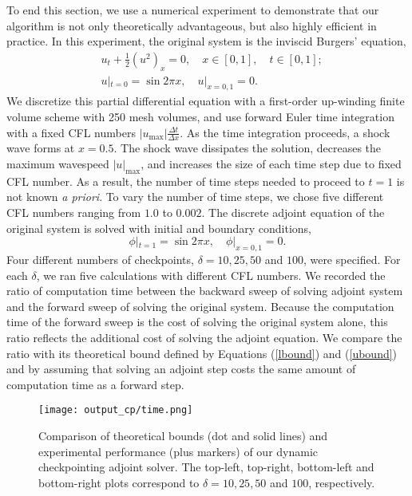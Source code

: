 To end this section, we use a numerical experiment to demonstrate that our
algorithm is not only theoretically advantageous, but also highly efficient
in practice.
In this experiment, the original system is the inviscid Burgers' equation,
\[ \begin{aligned}
    & u_t + \frac12 \left(u^2\right)_x = 0, \quad x \in [0, 1],
                                              \quad t \in [0, 1]; \\
    & u|_{t = 0} = \sin 2\pi x, \quad u|_{x = 0,1} = 0.
\end{aligned} \]
We discretize this partial differential equation with a first-order up-winding
finite volume scheme with 250 mesh volumes, and use forward Euler time
integration with a fixed CFL numbers $|u_{\max}| \frac{\Delta t}{\Delta x}$.
As the time integration proceeds, a shock wave forms at $x = 0.5$.  The shock
wave dissipates the solution, decreases the maximum wavespeed $|u|_{\max}$,
and increases the size of each time step due to fixed CFL number.
As a result, the number of time steps needed to proceed to $t = 1$ is not
known {\it a priori}.
To vary the number of time steps, we chose five different CFL
numbers ranging from $1.0$ to $0.002$.  The discrete adjoint equation of the
original system is solved with initial and boundary conditions,
\[ \phi|_{t = 1} = \sin 2\pi x, \quad \phi|_{x = 0, 1} = 0. \]
Four different numbers of checkpoints, $\delta = 10, 25, 50$ and $100$, were
specified.  For each $\delta$, we ran five calculations with different CFL
numbers.  We recorded the ratio of computation time between the backward sweep
of solving adjoint system and the forward sweep of solving the original system.
Because the computation time of the forward sweep is the cost of solving the
original system alone, this ratio reflects the additional cost of solving
the adjoint equation.  We compare the ratio with its theoretical bound defined
by Equations (\ref{lbound}) and (\ref{ubound}) and by assuming that solving an
adjoint step costs the same amount of computation time as a forward step.

\begin{figure}[htb!] \center
    \texttt{[image: output\_cp/time.png]}
    \caption{Comparison of theoretical bounds (dot and solid lines) and
             experimental
             performance (plus markers) of our dynamic checkpointing adjoint
             solver.  The top-left, top-right, bottom-left and bottom-right
             plots correspond to $\delta = 10, 25, 50$ and $100$, respectively.
            } \label{fig1}
\end{figure}

